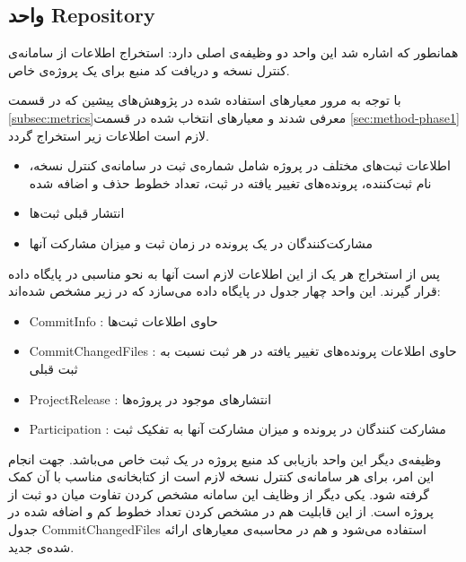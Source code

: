 \subsection{واحد  Repository}
 
همانطور که اشاره شد این واحد دو وظیفه‌ی اصلی دارد: استخراج اطلاعات از سامانه‌ی کنترل نسخه و دریافت کد منبع برای یک پروژه‌ی خاص. 

با توجه به مرور معیارهای استفاده شده در پژوهش‌های پیشین که در قسمت \ref{subsec:metrics}‌معرفی شدند و معیارهای انتخاب شده در قسمت \ref{sec:method-phase1}  لازم است اطلاعات زیر استخراج گردد.
\begin{itemize}
\item
اطلاعات ثبت‌های مختلف در پروژه شامل شماره‌ی ثبت در سامانه‌ی کنترل نسخه، نام ثبت‌کننده، پرونده‌های تغییر یافته در ثبت، تعداد خطوط حذف و اضافه شده
\item
انتشار قبلی ثبت‌ها
\item
مشارکت‌کنندگان در یک پرونده در زمان ثبت و میزان مشارکت آنها

\end{itemize}

پس از استخراج هر یک از این اطلاعات لازم است آنها به نحو مناسبی در پایگاه داده قرار گیرند. این واحد چهار جدول در پایگاه داده می‌سازد که در زیر مشخص شده‌اند:
\begin{itemize}
\item CommitInfo :
حاوی اطلاعات ثبت‌ها
\item CommitChangedFiles : 
حاوی اطلاعات پرونده‌های تغییر یافته در هر ثبت نسبت به ثبت قبلی
\item ProjectRelease :
انتشارهای موجود در پروژه‌ها
\item Participation :
مشارکت کنندگان در پرونده و میزان مشارکت آنها به تفکیک ثبت
\end{itemize}

وظیفه‌ی دیگر این واحد بازیابی کد منبع  پروژه در یک ثبت خاص  می‌باشد.  جهت انجام این امر،  برای هر سامانه‌ی کنترل نسخه لازم است از کتابخانه‌ی مناسب با آن کمک گرفته شود. یکی دیگر از وظایف این سامانه مشخص کردن تفاوت میان دو ثبت از پروژه است. از این قابلیت هم در مشخص کردن تعداد خطوط کم و اضافه شده در جدول CommitChangedFiles استفاده می‌شود و هم در محاسبه‌ی معیارهای ارائه شده‌ی جدید. 

